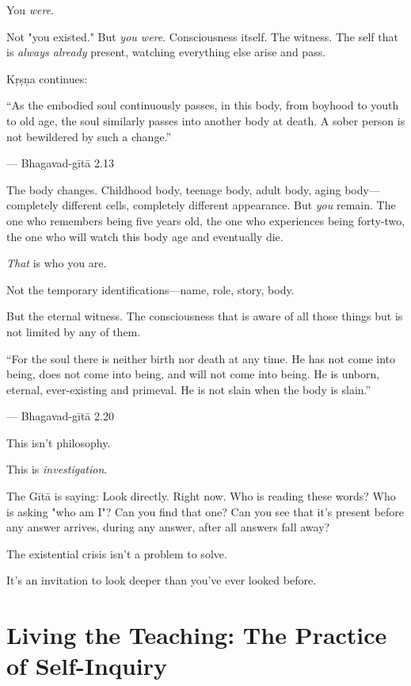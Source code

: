 \documentclass[11pt,twoside]{book}
\begin{document}
You \emph{were}.

Not "you existed." But \emph{you were}. Consciousness itself. The witness. The self that is \emph{always already} present, watching everything else arise and pass.

Kṛṣṇa continues:

\begin{pullquote}
``As the embodied soul continuously passes, in this body, from boyhood to youth to old age, the soul similarly passes into another body at death. A sober person is not bewildered by such a change.''

--- Bhagavad-gītā 2.13
\end{pullquote}

The body changes. Childhood body, teenage body, adult body, aging body—completely different cells, completely different appearance. But \emph{you} remain. The one who remembers being five years old, the one who experiences being forty-two, the one who will watch this body age and eventually die.

\emph{That} is who you are.

Not the temporary identifications—name, role, story, body.

But the eternal witness. The consciousness that is aware of all those things but is not limited by any of them.

\begin{pullquote}
``For the soul there is neither birth nor death at any time. He has not come into being, does not come into being, and will not come into being. He is unborn, eternal, ever-existing and primeval. He is not slain when the body is slain.''

--- Bhagavad-gītā 2.20
\end{pullquote}

This isn't philosophy.

This is \emph{investigation}.

The Gītā is saying: Look directly. Right now. Who is reading these words? Who is asking "who am I"? Can you find that one? Can you see that it's present before any answer arrives, during any answer, after all answers fall away?

The existential crisis isn't a problem to solve.

It's an invitation to look deeper than you've ever looked before.

\section*{Living the Teaching: The Practice of Self-Inquiry}
\end{document}
